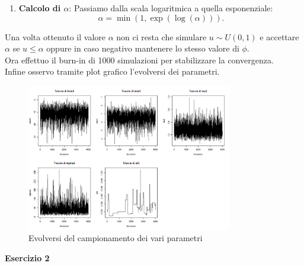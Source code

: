 \documentclass[a4paper,12pt]{article}
\begin{document}
\begin{itemize}
\begin{itemize}
\begin{enumerate}
				\item \textbf{Calcolo di $\alpha$}: Passiamo dalla scala logaritmica a quella esponenziale:
				\[
				\alpha = \min(1, \exp(\log(\alpha))).
				\]
			\end{enumerate}
		\end{itemize}
			Una volta ottenuto il valore $\alpha$ non ci resta che simulare $u \sim U(0,1)$ e accettare $\alpha$ se $u\leq\alpha$ oppure in caso negativo mantenere lo stesso valore di $\phi$.\\
			Ora effettuo il burn-in di 1000 simulazioni per stabilizzare la convergenza.\\
			Infine osservo tramite plot grafico l'evolversi dei parametri.
			\begin{figure}[h] %
				\centering %
				\includegraphics[width=0.8\textwidth]{mcmc1.png} %
				\caption{Evolversi del campionamento dei vari parametri} %
				\label{fig:immagine} %
			\end{figure}
		
	\end{itemize}
	\centering \textbf{Esercizio 2}\\
\end{document}
